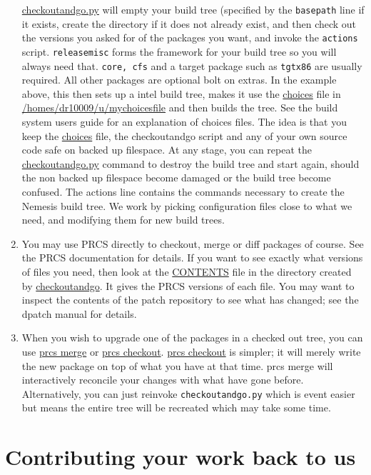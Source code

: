 \documentclass[a4paper]{article}
\newcommand{\file}[1]{\url{#1}}
\newcommand{\script}[1]{\url{#1}}
\begin{document}
\begin{enumerate}
\script{checkoutandgo.py} will empty your build tree (specified by the
\texttt{basepath} line if it exists, create the directory if it does
not already exist, and then check out the versions you asked for of
the packages you want, and invoke the \texttt{actions}
script. \texttt{releasemisc} forms the framework for your build tree
so you will always need that. \texttt{core, cfs} and a target package
such as \texttt{tgtx86} are usually required. All other packages are
optional bolt on extras.  In the example above, this then sets up a
intel build tree, makes it use the \file{choices} file in
\file{/homes/dr10009/u/mychoicesfile} and then builds the tree. See
the build system users guide for an explanation of choices files.  The
idea is that you keep the \file{choices} file, the checkoutandgo
script and any of your own source code safe on backed up filespace. At
any stage, you can repeat the \script{checkoutandgo.py} command to
destroy the build tree and start again, should the non backed up
filespace become damaged or the build tree become confused. The
actions line contains the commands necessary to create the Nemesis
build tree. We work by picking configuration files close to what we
need, and modifying them for new build trees.

\item You may use PRCS directly to checkout, merge or diff packages of
course. See the PRCS documentation for details. If you want to see
exactly what versions of files you need, then look at the
\file{CONTENTS} file in the directory created by
\script{checkoutandgo}. It gives the PRCS versions of each file.  You
may want to inspect the contents of the patch repository to see what
has changed; see the dpatch manual for details.

\item When you wish to upgrade one of the packages in a checked out
tree, you can use \script{prcs merge} or \script{prcs
checkout}. \script{prcs checkout} is simpler; it will merely write the
new package on top of what you have at that time. prcs merge will
interactively reconcile your changes with what have gone
before. Alternatively, you can just reinvoke \texttt{checkoutandgo.py}
which is event easier but means the entire tree will be recreated
which may take some time.

\end{enumerate}


\section{Contributing your work back to us}
\end{document}
